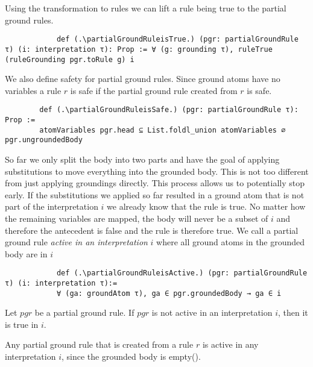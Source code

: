        Using the transformation to rules we can lift a rule being true to the partial ground rules.

        \begin{lstlisting}
            def (.\partialGroundRuleisTrue.) (pgr: partialGroundRule τ) (i: interpretation τ): Prop := ∀ (g: grounding τ), ruleTrue (ruleGrounding pgr.toRule g) i
        \end{lstlisting}

        We also define safety for partial ground rules. Since ground atoms have no variables a rule $r$ is safe if the partial ground rule created from $r$ is safe.

        \begin{lstlisting}     
        def (.\partialGroundRuleisSafe.) (pgr: partialGroundRule τ): Prop :=
        atomVariables pgr.head ⊆ List.foldl_union atomVariables ∅ pgr.ungroundedBody
        \end{lstlisting}

        So far we only split the body into two parts and have the goal of applying substitutions to move everything into the grounded body. This is not too different from just applying groundings directly. 
        This process allows us to potentially stop early. If the substitutions we applied so far resulted in a ground atom that is not part of the interpretation $i$ we already know that the rule is true. No matter how the remaining variables are mapped, the body will never be a subset of $i$ and therefore the antecedent is false and the rule is therefore true. We call a partial ground rule \textit{active in an interpretation} $i$ where all ground atoms in the grounded body are in $i$

        \begin{lstlisting}
            def (.\partialGroundRuleisActive.) (pgr: partialGroundRule τ) (i: interpretation τ):=
            ∀ (ga: groundAtom τ), ga ∈ pgr.groundedBody → ga ∈ i 
        \end{lstlisting}

        \begin{lemma}[\notActiveRuleIsTrue]
            Let $pgr$ be a partial ground rule. If $pgr$ is not active in an interpretation $i$, then it is true in $i$.
        \end{lemma}

        Any partial ground rule that is created from a rule $r$ is active in any interpretation $i$, since the grounded body is empty(\partialGroundRulefromRuleIsActive).

